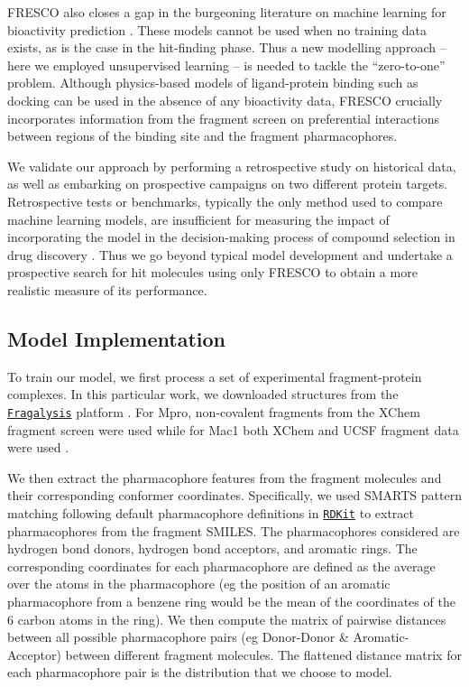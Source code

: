 FRESCO also closes a gap in the burgeoning literature on machine learning for bioactivity prediction \cite{muratov2020qsar}. These models cannot be used when no training data exists, as is the case in the hit-finding phase. Thus a new modelling approach -- here we employed unsupervised learning -- is needed to tackle the ``zero-to-one'' problem. Although physics-based models of ligand-protein binding such as docking \cite{Lyu2019UltraLargeDocking, Alon2021sigma, Fink2022Alpha} can be used in the absence of any bioactivity data, FRESCO crucially incorporates information from the fragment screen on preferential interactions between regions of the binding site and the fragment pharmacophores.

We validate our approach by performing a retrospective study on historical data, as well as embarking on prospective campaigns on two different protein targets. Retrospective tests or benchmarks, typically the only method used to compare machine learning models, are insufficient for measuring the impact of incorporating the model in the decision-making process of compound selection in drug discovery \cite{Kearnes2021Prospective}. Thus we go beyond typical model development and undertake a prospective search for hit molecules using only FRESCO to obtain a more realistic measure of its performance.

\subsection{Model Implementation} \label{subsec:model_construction}

To train our model, we first process a set of experimental fragment-protein complexes. In this particular work, we downloaded structures from the \href{https://fragalysis.diamond.ac.uk/viewer/react/landing}{\texttt{Fragalysis}} platform \cite{Douangamath2020XChem}. For Mpro, non-covalent fragments from the XChem fragment screen \cite{Douangamath2020XChem} were used while for Mac1 both XChem and UCSF fragment data were used \cite{Schuller2021Mac1Frag}.

We then extract the pharmacophore features from the fragment molecules and their corresponding conformer coordinates. Specifically, we used SMARTS pattern matching following default pharmacophore definitions in \href{https://www.rdkit.org/docs/index.html}{\texttt{RDKit}} \cite{rdkit} to extract pharmacophores from the fragment SMILES. The pharmacophores considered are hydrogen bond donors, hydrogen bond acceptors, and aromatic rings. The corresponding coordinates for each pharmacophore are defined as the average over the atoms in the pharmacophore (eg the position of an aromatic pharmacophore from a benzene ring would be the mean of the coordinates of the 6 carbon atoms in the ring). We then compute the matrix of pairwise distances between all possible pharmacophore pairs (eg Donor-Donor \& Aromatic-Acceptor) between different fragment molecules. The flattened distance matrix for each pharmacophore pair is the distribution that we choose to model.

